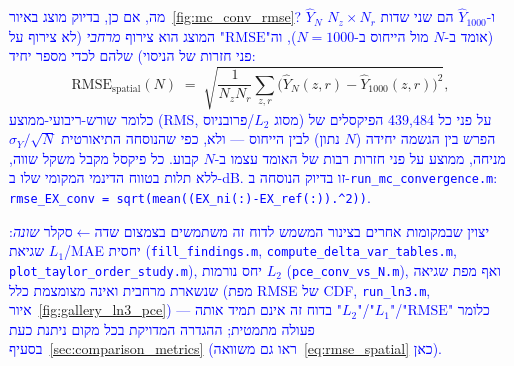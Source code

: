 \documentclass[12pt,a4paper]{article}
\DeclareRobustCommand{\aiedit}[1]{\textcolor{blue}{#1}}
\begin{document}
\aiedit{מה, אם כן, בדיוק מוצג באיור~\ref{fig:mc_conv_rmse}? $\hat Y_N$ ו-$\hat Y_{1000}$ הם שני שדות
$N_z\times N_r$ (אומד ב-$N$ מול הייחוס ב-$N=1000$), וה"$\mathrm{RMSE}$" המוצג הוא צירוף
\emph{מרחבי} (לא צירוף על פני חזרות של הניסוי) שלהם לכדי מספר יחיד:}
\begin{equation}
  \mathrm{RMSE}_{\mathrm{spatial}}(N) \;=\; \sqrt{\frac{1}{N_zN_r}\sum_{z,r}\bigl(\hat Y_N(z,r)-\hat Y_{1000}(z,r)\bigr)^2},
  \label{eq:rmse_spatial}
\end{equation}
\aiedit{כלומר שורש-ריבועי-ממוצע (\textenglish{RMS}, מסוג $L_2$/פרובניוס) על פני כל 439{,}484 הפיקסלים
של הפרש בין הגשמה יחידה ($N$ נתון) לבין הייחוס — ולא, כפי שהנוסחה התיאורטית $\sigma_Y/\sqrt N$
מניחה, ממוצע על פני חזרות רבות של האומד עצמו ב-$N$ קבוע. כל פיקסל מקבל משקל שווה, ללא תלות
בטווח הדינמי המקומי שלו ב-dB. זו בדיוק הנוסחה ב-\texttt{run\_mc\_convergence.m}: \texttt{rmse\_EX\_conv
= sqrt(mean((EX\_ni(:)-EX\_ref(:)).\string^2))}.}

\aiedit{יצוין שבמקומות אחרים בצינור המשמש לדוח זה משתמשים בצמצום שדה$\leftarrow$סקלר \emph{שונה}: שגיאת
$L_1$/\textenglish{MAE} יחסית (\texttt{fill\_findings.m}, \texttt{compute\_delta\_var\_tables.m},
\texttt{plot\_taylor\_order\_study.m}), יחס נורמות $L_2$ (\texttt{pce\_conv\_vs\_N.m}), ואף מפת
שגיאה שנשארת מרחבית ואינה מצומצמת כלל (מפת \textenglish{RMSE} של \textenglish{CDF},
\texttt{run\_ln3.m}, איור~\ref{fig:gallery_ln3_pce}) — כלומר "$\mathrm{RMSE}$"/"$L_1$"/"$L_2$" בדוח זה אינם תמיד אותה פעולה
מתמטית; ההגדרה המדויקת בכל מקום ניתנת כעת בסעיף~\ref{sec:comparison_metrics} (ראו גם
משוואה~\ref{eq:rmse_spatial} כאן).}
\end{document}
